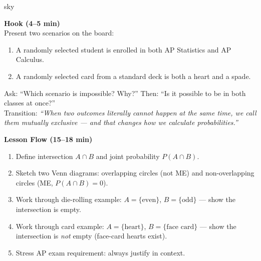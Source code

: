 \documentclass[10pt]{article}
\begin{document}
\begin{skillbox}{sky}
\begin{minipage}[t]{0.48\linewidth}
    \textbf{Hook (4--5 min)}\\
    Present two scenarios on the board:
    \begin{enumerate}
        \item A randomly selected student is enrolled in both AP Statistics and AP Calculus.
        \item A randomly selected card from a standard deck is both a heart and a spade.
    \end{enumerate}
    Ask: ``Which scenario is impossible? Why?'' Then: ``Is it possible to be in
    both classes at once?''\\[4pt]
    Transition: \textit{``When two outcomes literally cannot happen at the same time,
    we call them mutually exclusive --- and that changes how we calculate probabilities.''}
\end{minipage}
\hfill
\begin{minipage}[t]{0.48\linewidth}
    \textbf{Lesson Flow (15--18 min)}
    \begin{enumerate}
        \item Define intersection $A \cap B$ and joint probability $P(A \cap B)$.
        \item Sketch two Venn diagrams: overlapping circles (not ME) and
              non-overlapping circles (ME, $P(A \cap B) = 0$).
        \item Work through die-rolling example: $A = \{\text{even}\}$,
              $B = \{\text{odd}\}$ --- show the intersection is empty.
        \item Work through card example: $A = \{\text{heart}\}$, $B = \{\text{face card}\}$
              --- show the intersection is \emph{not} empty (face-card hearts exist).
        \item Stress AP exam requirement: always justify in context.
    \end{enumerate}
\end{minipage}
\end{skillbox}
\end{document}
